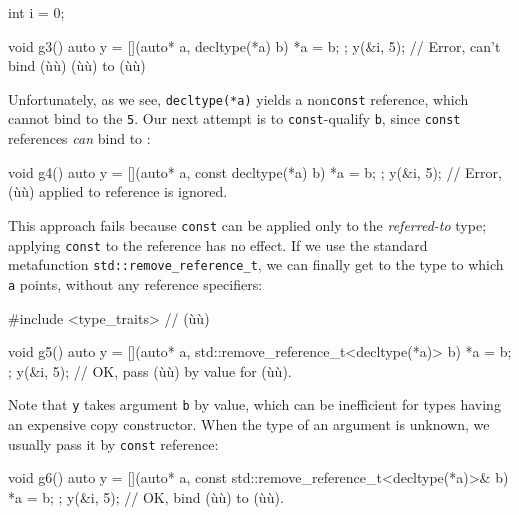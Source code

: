 {\begin{emcppslisting}
int i = 0;

void g3()
{
    auto y = [](auto* a, decltype(*a) b) { *a = b; };
    y(&i, 5);  // Error, can't bind (ù{}ù) (ù{}ù) to (ù{}ù)
}
\end{emcppslisting}
    

\noindent Unfortunately, as we see, \lstinline!decltype(*a)! yields a
non\lstinline!const!  reference, which cannot bind to the
 \lstinline!5!. Our next attempt is to \lstinline!const!-qualify
\lstinline!b!, since \lstinline!const! references \emph{can} bind to
:

\begin{emcppslisting}
void g4()
{
    auto y = [](auto* a, const decltype(*a) b) { *a = b; };
    y(&i, 5);  // Error, (ù{}ù) applied to reference is ignored.
}
\end{emcppslisting}
    

\noindent This approach fails because \lstinline!const! can be applied only to the
\emph{referred-to} type; applying \lstinline!const! to the reference has no
effect. If we use the standard metafunction
\lstinline!std::remove_reference_t!, we can finally get to the type to
which \lstinline!a! points, without any reference specifiers:

\begin{emcppslisting}
#include <type_traits>  // (ù{}ù)

void g5()
{
    auto y = [](auto* a, std::remove_reference_t<decltype(*a)> b)
    {
        *a = b;
    };
    y(&i, 5); // OK, pass (ù{}ù) by value for (ù{}ù).
}
\end{emcppslisting}
    

\noindent Note that \lstinline!y! takes argument \lstinline!b! by value, which can be
inefficient for types having an expensive copy constructor. When the
type of an argument is unknown, we usually pass it by \lstinline!const!
reference:

\begin{emcppslisting}
void g6()
{
    auto y = [](auto* a, const std::remove_reference_t<decltype(*a)>& b)
    {
        *a = b;
    };
    y(&i, 5); // OK, bind (ù{}ù) to (ù{}ù).
}
\end{emcppslisting}
    

}
